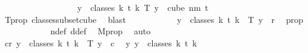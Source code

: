 \begin{isabellebody}
\ \ \ \ \ \ \isamarkupfalse%
\ {\isacharminus}{\kern0pt}\isanewline
\ \ \ \ \ \ \ \ \isamarkupfalse%
\ {\isachardoublequoteopen}{\isasymforall}y\ {\isasymin}\ classes\ {\isacharparenleft}{\kern0pt}k{\isacharplus}{\kern0pt}{}{\isacharparenright}{\kern0pt}\ t\ {\isacharparenleft}{\kern0pt}k{\isacharplus}{\kern0pt}{}{\isacharparenright}{\kern0pt}{\isachardot}{\kern0pt}\ T\ y\ {\isasymin}\ cube\ {\isacharparenleft}{\kern0pt}n{\isacharplus}{\kern0pt}m{\isacharparenright}{\kern0pt}\ {\isacharparenleft}{\kern0pt}t{\isacharplus}{\kern0pt}{}{\isacharparenright}{\kern0pt}{\isachardoublequoteclose}\ \isamarkupfalse%
\ T{\isacharunderscore}{\kern0pt}prop\ classes{\isacharunderscore}{\kern0pt}subset{\isacharunderscore}{\kern0pt}cube\ \isamarkupfalse%
\ blast\isanewline
\ \ \ \ \ \ \ \ \isamarkupfalse%
\ \isamarkupfalse%
\ {\isachardoublequoteopen}{\isasymforall}y\ {\isasymin}\ classes\ {\isacharparenleft}{\kern0pt}k{\isacharplus}{\kern0pt}{}{\isacharparenright}{\kern0pt}\ t\ {\isacharparenleft}{\kern0pt}k{\isacharplus}{\kern0pt}{}{\isacharparenright}{\kern0pt}{\isachardot}{\kern0pt}\ {\isasymchi}\ {\isacharparenleft}{\kern0pt}T\ y{\isacharparenright}{\kern0pt}\ {\isacharless}{\kern0pt}\ r{\isachardoublequoteclose}\ \isamarkupfalse%
\ {\isasymchi}{\isacharunderscore}{\kern0pt}prop\ \isanewline
\ \ \ \ \ \ \ \ \ \ \isamarkupfalse%
\ n{\isacharunderscore}{\kern0pt}def\ d{\isacharunderscore}{\kern0pt}def\ \isamarkupfalse%
\ M{\isacharprime}{\kern0pt}{\isacharunderscore}{\kern0pt}prop\ \isamarkupfalse%
\ auto\ \isanewline
\ \ \ \ \ \ \ \ \isamarkupfalse%
\ \isamarkupfalse%
\ {\isachardoublequoteopen}{\isasymexists}c{\isacharless}{\kern0pt}r{\isachardot}{\kern0pt}\ {\isasymforall}y\ {\isasymin}\ classes\ {\isacharparenleft}{\kern0pt}k{\isacharplus}{\kern0pt}{}{\isacharparenright}{\kern0pt}\ t\ {\isacharparenleft}{\kern0pt}k{\isacharplus}{\kern0pt}{}{\isacharparenright}{\kern0pt}{\isachardot}{\kern0pt}\ {\isasymchi}\ {\isacharparenleft}{\kern0pt}T\ y{\isacharparenright}{\kern0pt}\ {\isacharequal}{\kern0pt}\ c{\isachardoublequoteclose}\ \isamarkupfalse%
\ {\isacartoucheopen}{\isasymexists}{\isacharbang}{\kern0pt}y{\isachardot}{\kern0pt}\ y\ {\isasymin}\ classes\ {\isacharparenleft}{\kern0pt}k{\isacharplus}{\kern0pt}{}{\isacharparenright}{\kern0pt}\ t\ {\isacharparenleft}{\kern0pt}k{\isacharplus}{\kern0pt}{}{\isacharparenright}{\kern0pt}{\isacartoucheclose}\ \isamarkupfalse%

\end{isabellebody}
